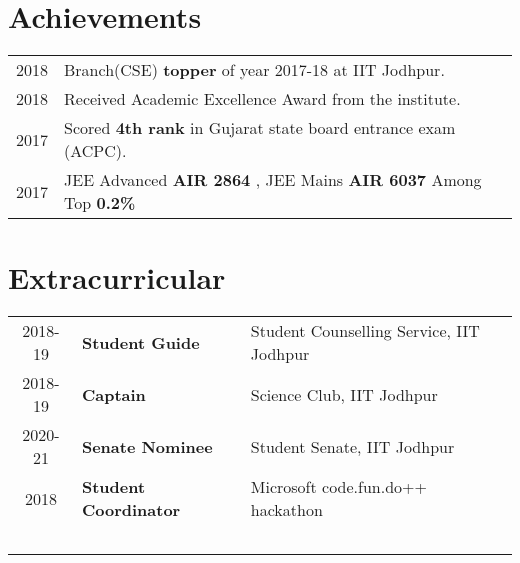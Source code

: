 \documentclass[a4paper]{deedy-resume-openfont}
\begin{document}
\begin{minipage}[t]{0.63\textwidth}

\section{Achievements}
\begin{tabular}{l p{}}
2018 & Branch(CSE) \textbf{topper} of year 2017-18 at IIT Jodhpur. \\
2018 & Received Academic Excellence Award from the institute. \\
2017 & Scored \textbf{4th rank} in Gujarat state board entrance exam (ACPC). \\
2017 & JEE Advanced \textbf{AIR 2864} , JEE Mains \textbf{AIR 6037} Among Top \textbf{0.2\%} \\
\end{tabular}
\sectionsep



\section{Extracurricular}
\begin{tabular}{ c l l }  
2018-19 & \textbf{Student Guide} & Student Counselling Service, IIT Jodhpur \\
2018-19 & \textbf{Captain} & Science Club, IIT Jodhpur \\
2020-21 & \textbf{Senate Nominee} & Student Senate, IIT Jodhpur \\  
  2018  & \textbf{Student Coordinator} & Microsoft code.fun.do++ hackathon\\\
 \end{tabular}
 
\end{minipage} 
\end{document}

